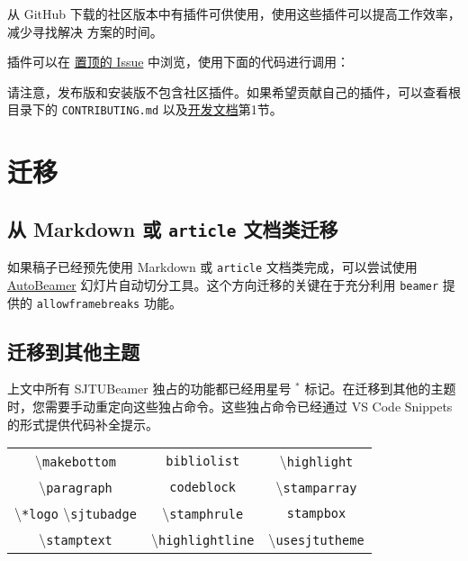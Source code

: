 \documentclass[
    UTF8,
    heading=true,
    12pt,
    a4paper
]{ctexrep}
\newcommand{\cmd}[1]{\textbackslash{}\texttt{#1}}
\newcommand{\cls}[1]{\texttt{#1}}
\newcommand{\env}[1]{\texttt{#1}}
\newcommand{\opt}[1]{\texttt{#1}}
\def\themename{\textsf{SJTUBeamer}}
\begin{document}
从 GitHub 下载的社区版本中有插件可供使用，使用这些插件可以提高工作效率，减少寻找解决
方案的时间。

插件可以在
\href{https://github.com/sjtug/SJTUBeamer/issues/81}
{置顶的 Issue} 中浏览，使用下面的代码进行调用：

请注意，发布版和安装版不包含社区插件。如果希望贡献自己的插件，可以查看根目录下的
\verb"CONTRIBUTING.md"
以及\href{run:sjtubeamerdevguide.pdf}{开发文档}第1节。


\chapter{迁移}

\section{从 Markdown 或 \cls{article} 文档类迁移}

如果稿子已经预先使用 Markdown 或 \cls{article} 文档类完成，可以尝试使用
\href{https://logcreative.github.io/AutoBeamer/}{AutoBeamer}
幻灯片自动切分工具。这个方向迁移的关键在于充分利用 \cls{beamer} 提供的
\opt{allowframebreaks} 功能。

\section{迁移到其他主题}

上文中所有 \themename{} 独占的功能都已经用星号 $^*$
标记。在迁移到其他的主题时，您需要手动重定向这些独占命令。这些独占命令已经通过 VS Code
Snippets 的形式提供代码补全提示。

\begin{table}[h]
  \centering
  \begin{tabular}{ccc}
    \hline
    \cmd{makebottom}            &
    \env{bibliolist}            & \cmd{highlight}
    \\
    \cmd{paragraph}             & \env{codeblock}
                                &
    \cmd{stamparray}
    \\
    \cmd{*logo} \cmd{sjtubadge} &
    \cmd{stamphrule}            & \env{stampbox}
    \\
    \cmd{stamptext}             &
    \cmd{highlightline}         &
    \cmd{usesjtutheme}
    \\
    \hline
  \end{tabular}
\end{table}
\end{document}
